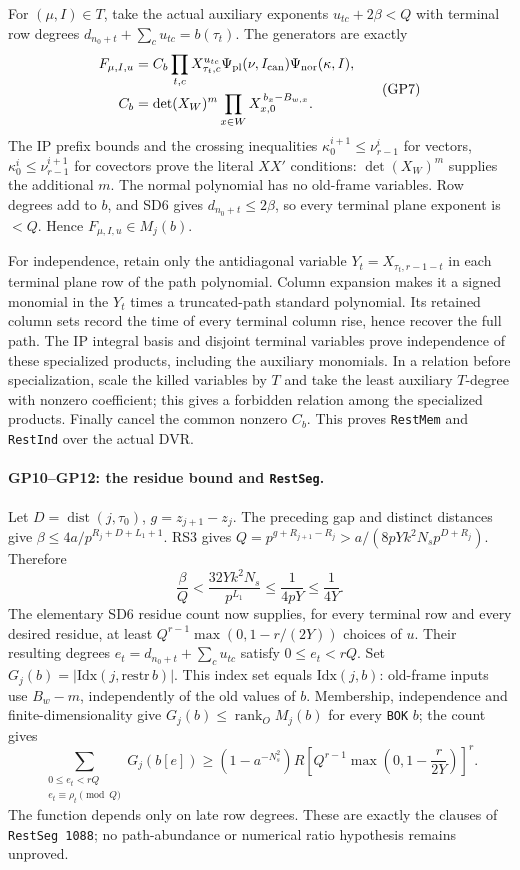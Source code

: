 \documentclass[11pt,a4paper]{article}
\numberwithin{equation}{section}
\theoremstyle{remark}\newtheorem{remark}[theorem]{Remark}
\begin{document}
For $(\mu,I)\in T$, take the actual auxiliary exponents
$u_{tc}+2\beta<Q$ with terminal row degrees
$d_{n_0+t}+\sum_cu_{tc}=b(\tau_t)$.  The generators are exactly
\[
 \begin{aligned}
 F_{\mu,I,u}&=C_b\prod_{t,c}X_{\tau_t,c}^{u_{tc}}
 \Psi_{\rm pl}(\nu,I_{\rm can})\Psi_{\rm nor}(\kappa,I),\\
 C_b&=\det(X_{W})^m\prod_{x\in W}X_{x,0}^{\,b_x-B_{w,x}}.
 \end{aligned}
 \tag{GP7}
\]
The IP prefix bounds and the crossing inequalities
$\kappa^{i+1}_0\leq\nu^i_{r-1}$ for vectors,
$\kappa^i_0\leq\nu^{i+1}_{r-1}$ for covectors prove the literal
$XX'$ conditions: $\det(X_W)^m$ supplies the additional $m$.
The normal polynomial has no old-frame variables.  Row degrees add
to $b$, and SD6 gives $d_{n_0+t}\leq2\beta$, so every terminal plane
exponent is $<Q$.  Hence $F_{\mu,I,u}\in M_j(b)$.

For independence, retain only the antidiagonal variable
$Y_t=X_{\tau_t,r-1-t}$ in each terminal plane row of the path polynomial.
Column expansion makes it a signed monomial in the $Y_t$ times a
truncated-path standard polynomial.  Its retained column sets record
the time of every terminal column rise, hence recover the full path.
The IP integral basis and disjoint terminal variables prove independence
of these specialized products, including the auxiliary monomials.
In a relation before specialization, scale the killed variables by $T$
and take the least auxiliary $T$-degree with nonzero coefficient;
this gives a forbidden relation among the specialized products.
Finally cancel the common nonzero $C_b$.  This proves
\texttt{RestMem} and \texttt{RestInd} over the actual DVR.

\paragraph{GP10--GP12: the residue bound and \texttt{RestSeg}.}
Let $D=\operatorname{dist}(j,\tau_0)$, $g=z_{j+1}-z_j$.
The preceding gap and distinct distances give
$\beta\leq4a/p^{R_j+D+L_1+1}$.  RS3 gives
$Q=p^{g+R_{j+1}-R_j}>a/(8pYk^2N_s p^{D+R_j})$.  Therefore
\[
 \frac\beta Q<\frac{32Yk^2N_s}{p^{L_1}}
 \leq\frac1{4pY}\leq\frac1{4Y}.
 \tag{GP8}
\]
The elementary SD6 residue count now supplies, for every terminal row
and every desired residue, at least
$Q^{r-1}\max(0,1-r/(2Y))$ choices of $u$.
Their resulting degrees $e_t=d_{n_0+t}+\sum_cu_{tc}$ satisfy
$0\leq e_t<rQ$.  Set $G_j(b)=|\mathrm{Idx}(j,\mathrm{restr}\,b)|$.
This index set equals $\mathrm{Idx}(j,b)$: old-frame inputs use
$B_w-m$, independently of the old values of $b$.
Membership, independence and finite-dimensionality give
$G_j(b)\leq\operatorname{rank}_O M_j(b)$ for every \texttt{BOK} $b$;
the count gives
\[
 \sum_{\substack{0\leq e_t<rQ\\e_t\equiv\rho_t\pmod Q}}
 G_j(b[e])
 \geq(1-a^{-N_s^2})R
       \left[Q^{r-1}\max\!\left(0,1-\frac r{2Y}\right)\right]^r.
 \tag{GP9}
\]
The function depends only on late row degrees.  These are exactly
the clauses of \texttt{RestSeg 1088}; no path-abundance or numerical
ratio hypothesis remains unproved.
\end{document}
